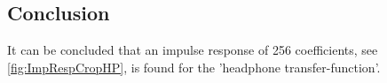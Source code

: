 \subsection{Conclusion}
It can be concluded that an impulse response of 256 coefficients, see \autoref{fig:ImpRespCropHP}, is found for the 'headphone transfer-function'.
